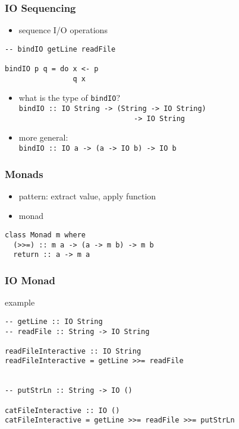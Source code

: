 \documentclass[dvipsnames]{beamer}
\theoremstyle{plain}
\begin{document}
\begin{frame}[fragile]
  \frametitle{IO Sequencing}

  \begin{itemize}
    \item sequence I/O operations
  \end{itemize}

  \begin{exampleblock}{}
    \begin{lstlisting}
-- bindIO getLine readFile

bindIO p q = do x <- p
                q x
    \end{lstlisting}

    \pause
    \medskip
    \begin{itemize}
      \item what is the type of \lstinline|bindIO|?\\
        \lstinline|bindIO :: IO String -> (String -> IO String)|\\
        \lstinline|                           -> IO String|
      \pause
      \smallskip
      \item more general:\\
        \lstinline|bindIO :: IO a -> (a -> IO b) -> IO b|
    \end{itemize}
  \end{exampleblock}
\end{frame}

\begin{frame}[fragile]
  \frametitle{Monads}

  \begin{itemize}
    \item pattern: extract value, apply function
    \item \alert{monad}
  \end{itemize}

  \begin{lstlisting}
class Monad m where
  (>>=) :: m a -> (a -> m b) -> m b
  return :: a -> m a
  \end{lstlisting}
\end{frame}

\begin{frame}[fragile]
  \frametitle{IO Monad}

  \begin{exampleblock}{example}
    \begin{lstlisting}
-- getLine :: IO String
-- readFile :: String -> IO String

readFileInteractive :: IO String
readFileInteractive = getLine >>= readFile


-- putStrLn :: String -> IO ()

catFileInteractive :: IO ()
catFileInteractive = getLine >>= readFile >>= putStrLn
    \end{lstlisting}
  \end{exampleblock}
\end{frame}
\end{document}
